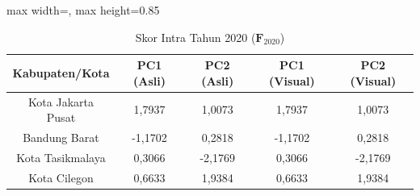 \begin{table}[H]
\centering
\caption{Skor Intra Tahun 2020 ($\mathbf{F}_{2020}$)} \label{tab:sample2skor_intra_2020}
\begin{adjustbox}{max width=\textwidth, max height=0.85\textheight}
\begin{tabular}{|c|c|c|c|c|}
\hline
\textbf{Kabupaten/Kota} & \textbf{PC1 (Asli)} & \textbf{PC2 (Asli)} & \textbf{PC1 (Visual)} & \textbf{PC2 (Visual)} \\
\hline
Kota Jakarta Pusat & 1,7937 & 1,0073 & 1,7937 & 1,0073 \\
Bandung Barat & -1,1702 & 0,2818 & -1,1702 & 0,2818 \\
Kota Tasikmalaya & 0,3066 & -2,1769 & 0,3066 & -2,1769 \\
Kota Cilegon & 0,6633 & 1,9384 & 0,6633 & 1,9384 \\
\hline
\end{tabular}
\end{adjustbox}
\end{table}